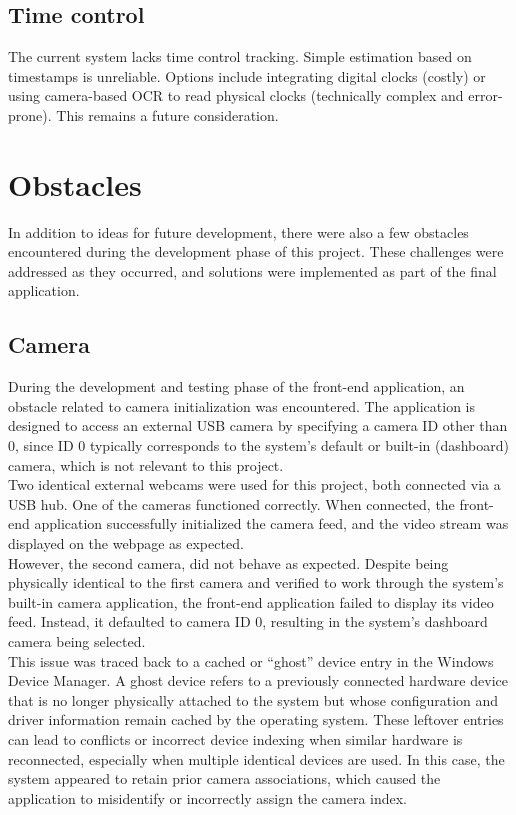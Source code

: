 \subsection{Time control}
The current system lacks time control tracking. Simple estimation based on timestamps is unreliable. Options include integrating digital clocks (costly) or using camera-based OCR to read physical clocks (technically complex and error-prone). This remains a future consideration. \\

\section{Obstacles}
In addition to ideas for future development, there were also a few obstacles encountered during the development phase of this project. These challenges were addressed as they occurred, and solutions were implemented as part of the final application.

\subsection{Camera}
During the development and testing phase of the front-end application, an obstacle related to camera initialization was encountered. The application is designed to access an external USB camera by specifying a camera ID other than 0, since ID 0 typically corresponds to the system's default or built-in (dashboard) camera, which is not relevant to this project.\\

Two identical external webcams were used for this project, both connected via a USB hub. One of the cameras functioned correctly. When connected, the front-end application successfully initialized the camera feed, and the video stream was displayed on the webpage as expected.\\

However, the second camera, did not behave as expected. Despite being physically identical to the first camera and verified to work through the system's built-in camera application, the front-end application failed to display its video feed. Instead, it defaulted to camera ID 0, resulting in the system's dashboard camera being selected.\\

This issue was traced back to a cached or “ghost” device entry in the Windows Device Manager. A ghost device refers to a previously connected hardware device that is no longer physically attached to the system but whose configuration and driver information remain cached by the operating system. These leftover entries can lead to conflicts or incorrect device indexing when similar hardware is reconnected, especially when multiple identical devices are used. In this case, the system appeared to retain prior camera associations, which caused the application to misidentify or incorrectly assign the camera index.

